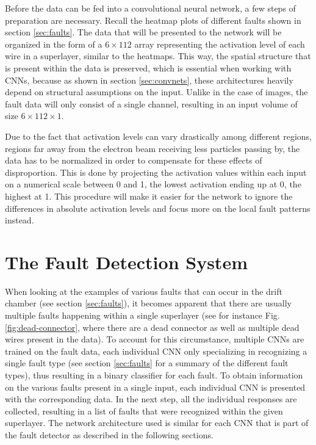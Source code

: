 Before the data can be fed into a convolutional neural network, a few
steps of preparation are necessary. Recall the heatmap plots of
different faults shown in section \ref{sec:faults}. The data that will
be presented to the network will be organized in the form of a \(6
\times 112\) array representing the activation level of each wire in a
superlayer, similar to the heatmaps. This way, the spatial structure
that is present within the data is preserved, which is essential when
working with CNNs, because as shown in section \ref{sec:convnets},
these architectures heavily depend on structural assumptions on the
input. Unlike in the case of images, the fault data will only consist
of a single channel, resulting in an input volume of size \(6
\times 112 \times 1\).

Due to the fact that activation levels can vary drastically among
different regions, regions far away from the electron beam receiving
less particles passing by, the data has to be normalized in order to
compensate for these effects of disproportion. This is done by projecting
the activation values within each input on a numerical scale between 0
and 1, the lowest activation ending up at 0, the highest at 1. This
procedure will make it easier for the network to ignore the
differences in absolute activation levels and focus more on the local
fault patterns instead.

\section{The Fault Detection System}

When looking at the examples of various faults that can occur in the
drift chamber (see section \ref{sec:faults}), it becomes apparent that
there are usually multiple faults happening within a single
superlayer (see for instance Fig. \ref{fig:dead-connector}, where
there are a dead connector as well as multiple dead wires present in
the data). To account for this circumstance, multiple CNNs are
trained on the fault data, each individual CNN only specializing in
recognizing a single fault type (see section \ref{sec:faults} for a
summary of the different fault types), thus
resulting in a binary classifier for each fault. To obtain information
on the various faults present in a single input, each individual CNN
is presented with the corresponding data. In the next step, all the
individual responses are collected, resulting in a list of faults that
were recognized within the given superlayer. The network architecture
used is similar for each CNN that is part of the fault detector as
described in the following sections.

